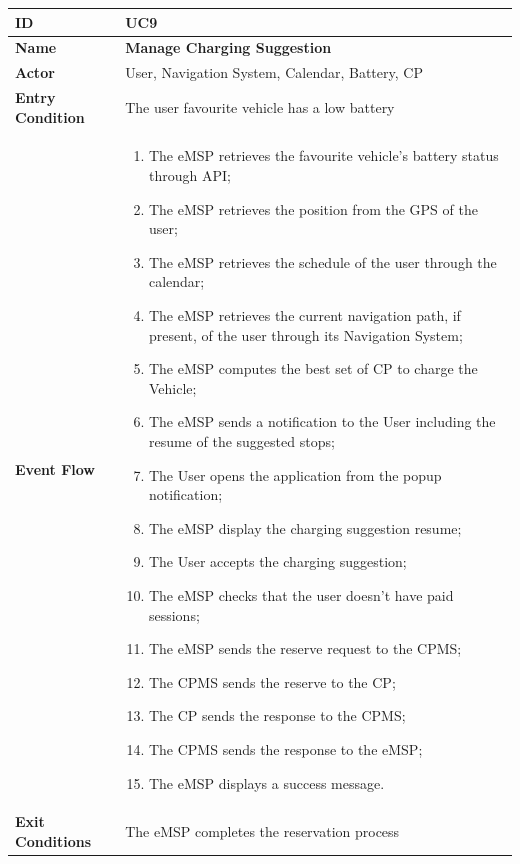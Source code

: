 \documentclass{Configuration_Files/PoliMi3i_thesis}
\begin{document}
\begin{table}[H]
    \begin{xltabular}{\textwidth}{| >{}l | X |}
    \hline
    \textbf{ID} & \textbf{UC9}\T\B\\
    \hline
    \textbf{Name} & \textbf{Manage Charging Suggestion}\T\B\\
    \hline \hline
    \textbf{Actor} & User, Navigation System, Calendar, Battery, CP\T\B \\
    \hline
    \textbf{Entry Condition} & The user favourite vehicle has a low battery\T\B\\
    \hline
    \textbf{Event Flow} & 
        \begin{enumerate}
        \item The eMSP retrieves the favourite vehicle’s  battery status through API;
        \item The eMSP retrieves the position from the GPS of the user;
        \item The eMSP retrieves the schedule of the user through the calendar;
        \item The eMSP retrieves the current navigation path, if present, of the user through its Navigation System;
        \item The eMSP computes the best set of CP to charge the Vehicle;
        \item The eMSP sends a notification to the User including the resume of the suggested stops;
        \item The User opens the application from the popup notification;
        \item The eMSP display the charging suggestion resume;
        \item The User accepts the charging suggestion;
        \item The eMSP checks that the user doesn’t have paid sessions;
        \item The eMSP sends the reserve request to the CPMS;
        \item The CPMS sends the reserve to the CP;
        \item The CP sends the response to the CPMS;
        \item The CPMS sends the response to the eMSP;
        \item The eMSP displays a success message.
        \end{enumerate}\B\\
    \hline
    \textbf{Exit Conditions} & The eMSP completes the reservation process\B\\

\end{xltabular}
\end{table}
\end{document}
